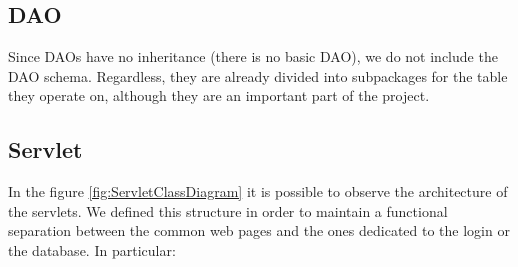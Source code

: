 \subsection*{DAO}

Since DAOs have no inheritance (there 
is no basic DAO), we do not include the DAO schema.
Regardless, they are already divided into subpackages for the table they 
operate on, although they are an important part of the project.


\subsection*{Servlet}

In the figure \ref{fig:ServletClassDiagram} it is possible to observe the 
architecture of the servlets. 
We defined this structure in order to maintain a functional separation 
between the common web pages and the ones dedicated to the login or the database.
In particular: 
